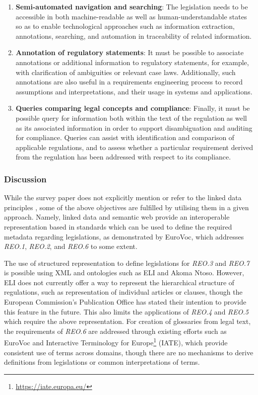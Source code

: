 \begin{enumerate}[label={\textit{REO.\theenumi}}]
    \item \textbf{Semi-automated navigation and searching}: The legislation needs to be accessible in both machine-readable as well as human-understandable states so as to enable technological approaches such as information extraction, annotations, searching, and automation in traceability of related information.
    \item \textbf{Annotation of regulatory statements}: It must be possible to associate annotations or additional information to regulatory statements, for example, with clarification of ambiguities or relevant case laws. Additionally, such annotations are also useful in a requirements engineering process to record assumptions and interpretations, and their usage in systems and applications.
    \item \textbf{Queries comparing legal concepts and compliance}: Finally, it must be possible query for information both within the text of the regulation as well as its associated information in order to support disambiguation and auditing for compliance. 
    Queries can assist with identification and comparison of applicable regulations, and to assess whether a particular requirement derived from the regulation has been addressed with respect to its compliance.
\end{enumerate}

\subsubsection{Discussion}
While the survey paper does not explicitly mention or refer to the linked data principles \cite{bizer_linked_2011}, some of the above objectives are fulfilled by utilising them in a given approach. Namely, linked data and semantic web provide an interoperable representation based in standards which can be used to define the required metadata regarding legislations, as demonstrated by EuroVoc, which addresses \textit{REO.1}, \textit{REO.2}, and \textit{REO.6} to some extent.

The use of structured representation to define legislations for \textit{REO.3} and \textit{REO.7} is possible using XML and ontologies such as ELI and Akoma Ntoso. However, ELI does not currently offer a way to represent the hierarchical structure of regulations, such as representation of individual articles or clauses, though the European Commission's Publication Office has stated their intention to provide this feature in the future.
This also limits the applications of \textit{REO.4} and \textit{REO.5} which require the above representation.
For creation of glossaries from legal text, the requirements of \textit{REO.6} are addressed through existing efforts such as EuroVoc and Interactive Terminology for Europe\footnote{\url{https://iate.europa.eu/}} (IATE), which provide consistent use of terms across domains, though there are no mechanisms to derive definitions from legislations or common interpretations of terms.


